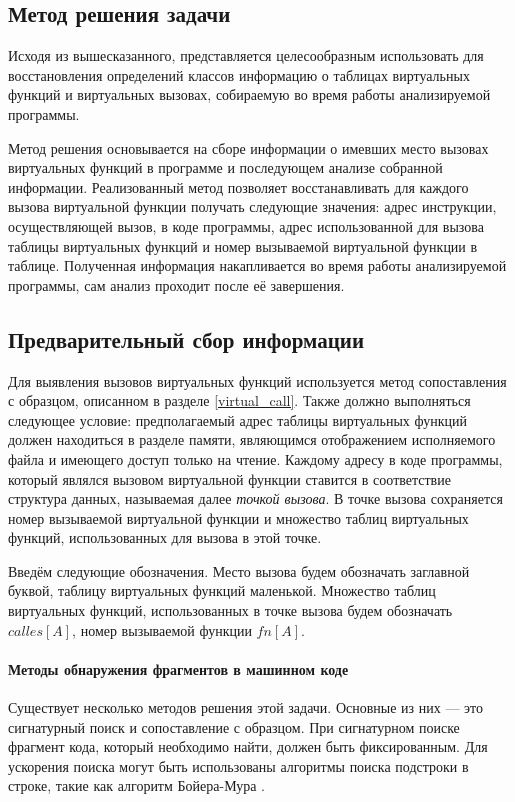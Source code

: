 \documentclass[a4paper,12pt,russian]{article}
\begin{document}
\subsection{Метод решения задачи}
Исходя из вышесказанного, представляется целесообразным использовать для восстановления определений классов информацию о таблицах виртуальных функций и виртуальных вызовах, собираемую во время работы анализируемой программы.

Метод решения основывается на сборе информации о имевших место вызовах виртуальных функций в программе и последующем анализе собранной информации.
Реализованный метод позволяет восстанавливать для каждого вызова виртуальной функции получать следующие значения: адрес инструкции, осуществляющей вызов, в коде программы, адрес использованной для вызова таблицы виртуальных функций и номер вызываемой виртуальной функции в таблице.
Полученная информация накапливается во время работы анализируемой программы, сам анализ проходит после её завершения.

\subsection{Предварительный сбор информации}
Для выявления вызовов виртуальных функций используется метод сопоставления с образцом, описанном в разделе \ref{virtual_call}.
Также должно выполняться следующее условие: предполагаемый адрес таблицы виртуальных функций должен находиться в разделе памяти, являющимся отображением исполняемого файла и имеющего доступ только на чтение.
Каждому адресу в коде программы, который являлся вызовом виртуальной функции ставится в соответствие структура данных, называемая далее \emph{точкой вызова}.
В точке вызова сохраняется номер вызываемой виртуальной функции и множество таблиц виртуальных функций, использованных для вызова в этой точке.

Введём следующие обозначения.
Место вызова будем обозначать заглавной буквой, таблицу виртуальных функций маленькой.
Множество таблиц виртуальных функций, использованных в точке вызова будем обозначать $calles[A]$, номер вызываемой функции $fn[A]$.
\paragraph{Методы обнаружения фрагментов в машинном коде}
Существует нес\-колько методов решения этой задачи.
Основные из них --- это сигнатурный поиск и сопоставление с образцом.
При сигнатурном поиске фрагмент кода, который необходимо найти, должен быть фиксированным.
Для ускорения поиска могут быть использованы алгоритмы поиска подстроки в строке, такие как алгоритм Бойера-Мура \cite{corman}.
\end{document}
